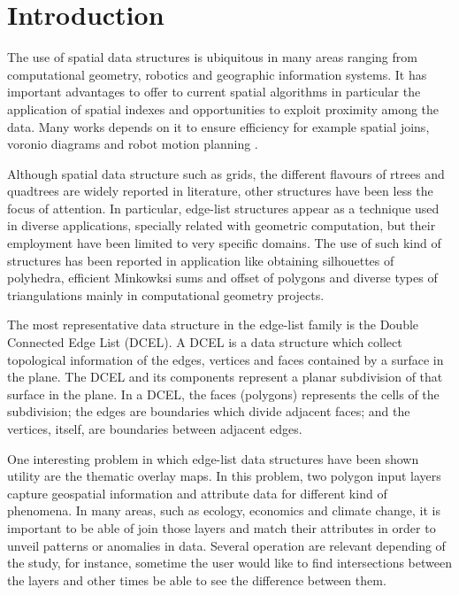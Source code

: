 \section{Introduction}
The use of spatial data structures is ubiquitous in many areas ranging from computational geometry, robotics and geographic information systems.  It has important advantages to offer to current spatial algorithms in particular the application of spatial indexes and opportunities to exploit proximity among the data.  Many works depends on it to ensure efficiency for example spatial joins, voronio diagrams and robot motion planning \cite{berg_computational_2008}.

Although spatial data structure such as grids, the different flavours of rtrees and quadtrees are widely reported in literature, other structures have been less the focus of attention.  In particular, edge-list structures appear as a technique used in diverse applications, specially related with geometric computation, but their employment have been limited to very specific domains.  The use of such kind of structures has been reported in application like obtaining silhouettes of polyhedra, efficient Minkowksi sums and offset of polygons and diverse types of triangulations mainly in computational geometry projects.

The most representative data structure in the edge-list family is the Double Connected Edge List (DCEL).  A DCEL \cite{muller_finding_1978, preparata_computational_1985} is a data structure which collect topological information of the edges, vertices and faces contained by a surface in the plane.  The DCEL and its components represent a planar subdivision of that surface in the plane. In a DCEL, the faces (polygons) represents the cells of the subdivision; the edges are boundaries which divide adjacent faces; and the vertices, itself, are boundaries between adjacent edges.

One interesting problem in which edge-list data structures have been shown utility are the thematic overlay maps. In this problem, two polygon input layers capture geospatial information and attribute data for different kind of phenomena.  In many areas, such as ecology, economics and climate change, it is important to be able of join those layers and match their attributes in order to unveil patterns or anomalies in data.  Several operation are relevant depending of the study, for instance, sometime the user would like to find intersections between the layers and other times be able to see the difference between them. 

